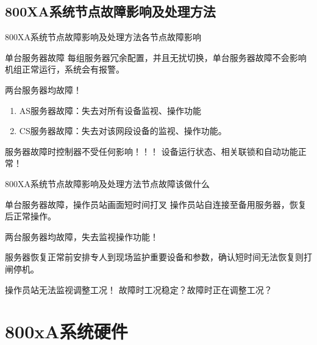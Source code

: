 \documentclass[12pt,hyperref={CJKbookmarks=true}]{beamer} %
\begin{document}
\subsection{800XA系统节点故障影响及处理方法}
\begin{frame}{800XA系统节点故障影响及处理方法}{各节点故障影响}
\begin{block}{\heiti 单台服务器故障}
			每组服务器冗余配置，并且无扰切换，单台服务器故障不会影响机组正常运行，系统会有报警。
		\end{block}
\pause
\begin{exampleblock}{\heiti 两台服务器均故障！}
			\begin{enumerate}
				\item  AS服务器故障：失去对所有设备监视、操作功能
				
				\item   CS服务器故障：失去对该网段设备的监视、操作功能。
				
			\end{enumerate}
		\end{exampleblock}
\pause
\begin{alertblock}{\heiti 服务器故障时控制器不受任何影响！！！}
			设备运行状态、相关联锁和自动功能正常！
		\end{alertblock}
\end{frame}
\begin{frame}{800XA系统节点故障影响及处理方法}{节点故障该做什么}
\begin{block}{\heiti 单台服务器故障，操作员站画面短时间打叉}
			操作员站自连接至备用服务器，恢复后正常操作。
		\end{block}
\pause
\begin{exampleblock}{\heiti 两台服务器均故障，失去监视操作功能！}
			
				服务器恢复正常前安排专人到现场监护重要设备和参数，确认短时间无法恢复则打闸停机。
			
		\end{exampleblock}
\pause
\begin{alertblock}{\heiti 操作员站无法监视调整工况！}
			故障时工况稳定？故障时正在调整工况？
		\end{alertblock}
\end{frame}
\section{800xA系统硬件}
\end{document}
